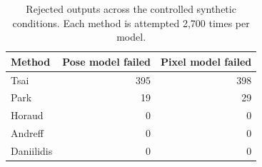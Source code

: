 \begin{table}[!htbp]\centering\footnotesize\setlength{\tabcolsep}{4pt}
\caption{Rejected outputs across the controlled synthetic conditions. Each method is attempted 2,700 times per model.}\label{tab:failures}
\begin{tabular}{lrr}
\toprule
Method & Pose model failed & Pixel model failed \\
\midrule
Tsai & 395 & 398 \\
Park & 19 & 29 \\
Horaud & 0 & 0 \\
Andreff & 0 & 0 \\
Daniilidis & 0 & 0 \\
\bottomrule
\end{tabular}
\end{table}
